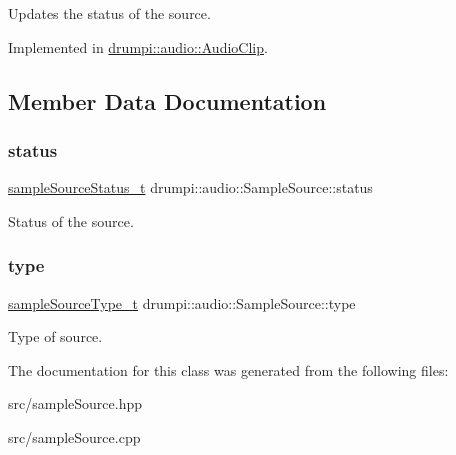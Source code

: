 Updates the status of the source. 

Implemented in \hyperlink{classdrumpi_1_1audio_1_1AudioClip_aeed08721b08d9443a769a99e717f5743}{drumpi\+::audio\+::\+Audio\+Clip}.



\subsection{Member Data Documentation}
\mbox{\label{classdrumpi_1_1audio_1_1SampleSource_a0278ea1fe44e5c1c643d6c8549302f19}} 
\subsubsection{\texorpdfstring{status}{status}}
{\footnotesize\ttfamily \hyperlink{namespacedrumpi_1_1audio_a51bdf5757f414341f104d45e75e2bf63}{sample\+Source\+Status\+\_\+t} drumpi\+::audio\+::\+Sample\+Source\+::status\hspace{0.3cm}{\ttfamily [protected]}}

Status of the source. \mbox{\label{classdrumpi_1_1audio_1_1SampleSource_af3411ed42fcc880fb0a69d2dd80aac18}} 
\subsubsection{\texorpdfstring{type}{type}}
{\footnotesize\ttfamily \hyperlink{namespacedrumpi_1_1audio_a997f55e8a5b5348cf74dbedb7abe8a59}{sample\+Source\+Type\+\_\+t} drumpi\+::audio\+::\+Sample\+Source\+::type\hspace{0.3cm}{\ttfamily [protected]}}

Type of source. 

The documentation for this class was generated from the following files\+:\begin{DoxyCompactItemize}
\item 
src/sample\+Source.\+hpp\item 
src/sample\+Source.\+cpp\end{DoxyCompactItemize}
